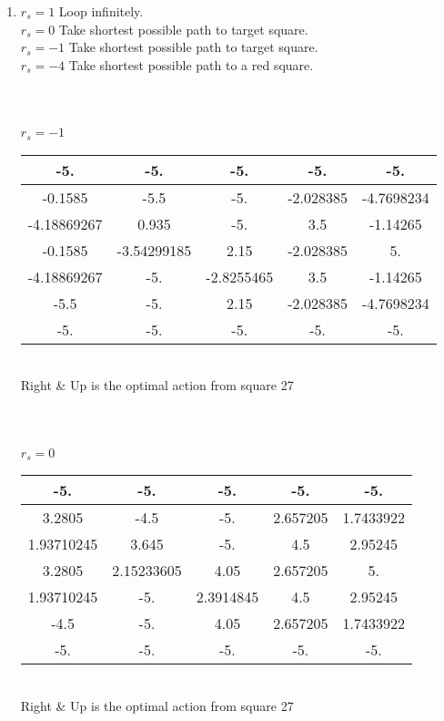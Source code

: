 \documentclass[11pt]{article}
\begin{document}
\begin{tcolorbox}[breakable]
\begin{enumerate}[label=(\alph*)]
    \item
    $r_s = 1$ Loop infinitely.\\
    $r_s = 0$ Take shortest possible path to target square. \\
    $r_s = -1$ Take shortest possible path to target square. \\
    $r_s = -4$ Take shortest possible path to a red square. \\ 
    \\
    \\
    \\
    $r_s = -1$\\ 
    \begin{tabular}{ | c | c | c | c | c | }
    \hline
    -5.       &  -5.     &    -5.    &     -5.      &   -5.        \\
    \hline
    -0.1585   &  -5.5    &    -5.    &     -2.028385 &  -4.7698234 \\
    \hline
    -4.18869267 & 0.935  &   -5.     &     3.5     &   -1.14265   \\
    \hline
    -0.1585   &  -3.54299185 & 2.15   &    -2.028385 &   5.        \\
    \hline
    -4.18869267 & -5.    &     -2.8255465 &  3.5   &     -1.14265   \\
    \hline
    -5.5      &  -5.     &     2.15    &   -2.028385 &  -4.7698234 \\
    \hline
    -5.       &  -5.      &   -5.    &    -5.    &     -5.      \\
    \hline
    \end{tabular}
    \\
    Right \& Up is the optimal action from square 27\\
        \\
    \\
    \\
    $r_s = 0$\\ 
    \begin{tabular}{ | c | c | c | c | c | }
    \hline
    -5.       &  -5.     &    -5.    &     -5.      &   -5.        \\
    \hline
    3.2805   &  -4.5     &   -5.     &     2.657205 &   1.7433922 \\
    \hline
    1.93710245 & 3.645   &   -5.     &     4.5      &   2.95245   \\
    \hline
    3.2805    &  2.15233605 & 4.05    &    2.657205  &  5.      \\
    \hline
    1.93710245 &-5.      &    2.3914845  & 4.5      &   2.95245  \\
    \hline
    -4.5      &  -5.     &     4.05    &    2.657205 &   1.7433922\\
    \hline
    -5.       &  -5.      &   -5.    &    -5.    &     -5.      \\
    \hline
    \end{tabular}
    \\
    Right \& Up is the optimal action from square 27\\
    

\end{enumerate}
\end{tcolorbox}
\end{document}
